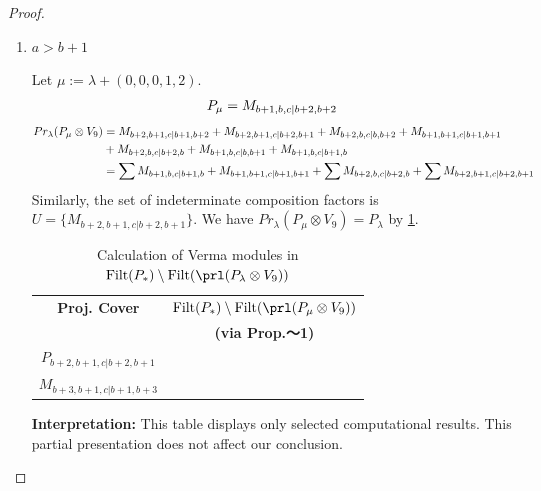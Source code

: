 \begin{proof}
\begin{enumerate}
\begin{enumerate}
        \item $a>b+1$ \par
        Let $\mu:=\lambda + (0,0,0,1,2) $.
        \begin{equation}\notag
          \begin{aligned}
            P_\mu = M_{b+1,b,c|b+2,b+2}
          \end{aligned}
        \end{equation}
        \begin{equation}\notag
          \begin{aligned}
            Pr_{\lambda}(P_\mu \otimes V_{9}) &=
M_{b+2,b+1,c|b+1,b+2}
+ M_{b+2,b+1,c|b+2,b+1}
+ M_{b+2,b,c|b,b+2}
+ M_{b+1,b+1,c|b+1,b+1}\\
                                              &
+ M_{b+2,b,c|b+2,b}
+ M_{b+1,b,c|b,b+1}
+ M_{b+1,b,c|b+1,b} \\
                                               &=
\sum M_{b+1,b,c|b+1,b}
+  M_{b+1,b+1,c|b+1,b+1}
+ \sum M_{b+2,b,c|b+2,b}
+ \sum M_{b+2,b+1,c|b+2,b+1}
          \end{aligned}
        \end{equation}
      Similarly, the set of indeterminate composition factors is $U = \{
M_{b+2,b+1,c|b+2,b+1}
\}$. We have $Pr_{\lambda}(P_\mu \otimes V_{9}) = P_\lambda  $ by \cref{tab:verma-analysis_c_2}.
\begin{table}[htbp]
\centering
\caption{Calculation of Verma modules in $\operatorname{Filt}(P_*) \setminus \operatorname{Filt}(\prl(P_\lambda \otimes V_{9})) $ } \label{tab:verma-analysis_c_2}
\begin{tabular}{cc}
\toprule
\textbf{Proj. Cover} & \textbf{$\operatorname{Filt}(P_*) \setminus \operatorname{Filt}(\prl(P_\mu \otimes V_{9})) $}  \\
     & \textbf{(via Prop.～1)}  \\
\midrule
 $P_{b+2,b+1,c|b+2,b+1}$ & \makecell{
 $M_{b+3,b+1,c|b+3,b+1}$,
 $M_{b+2,b+2,c|b+2,b+2}$,
 $M_{b+3,b+2,c|b+2,b+3}$,
 $M_{b+2,b+1,c|b+1,b+2}$, \\
 $M_{b+3,b+1,c|b+1,b+3}$
}\\
\bottomrule
\end{tabular}
\vspace{0.5em}
\parbox{\linewidth}{\small
\textbf{Interpretation:}
This table displays only selected computational results. This partial presentation does not affect our conclusion.
}
\end{table}
      \end{enumerate}

\end{enumerate}
\end{proof}

